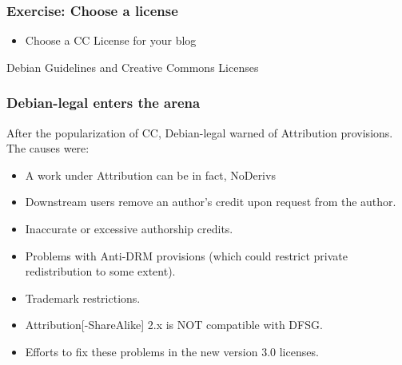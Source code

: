 
\begin{frame}
\frametitle{Exercise: Choose a license}

\begin{itemize}
\item Choose a CC License for your blog
\end{itemize}
\end{frame}




\begin{frame}
\begin{center}
\huge{Debian Guidelines and Creative Commons Licenses}
\end{center}

\end{frame}



\begin{frame}
\frametitle{Debian-legal enters the arena}

After the popularization of CC, Debian-legal warned of
Attribution provisions. The causes were:

\begin{itemize}
\item A work under Attribution can be in fact, NoDerivs 
\item Downstream users remove an author's credit upon request from the author.
\item Inaccurate or excessive authorship credits.
\item Problems with Anti-DRM provisions (which could restrict private redistribution to some extent).
\item Trademark restrictions.
\item Attribution[-ShareAlike] 2.x is NOT compatible with DFSG. 
\item Efforts to fix these problems in the new version 3.0 licenses.

\end{itemize}


\end{frame}




